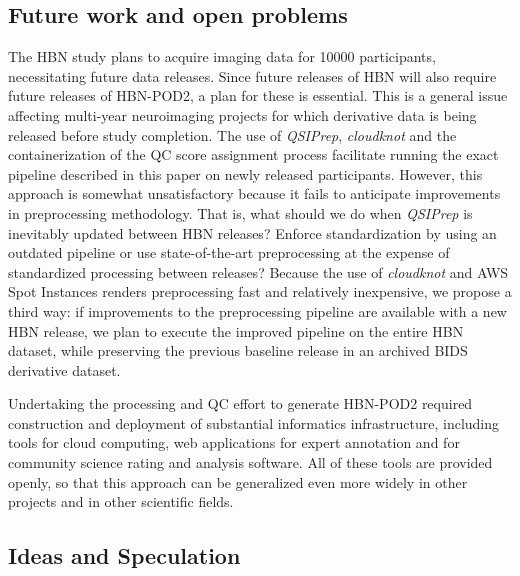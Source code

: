 \documentclass[9pt,lineno]{elife}
\begin{document}
\subsection{Future work and open problems}

The HBN study plans to acquire imaging data for \num{10000} participants,
necessitating future data releases. Since future releases of HBN will also require future releases of HBN-POD2, a plan for these is essential. This is
a general issue affecting multi-year neuroimaging projects for which derivative
data is being released before study completion. The use of \emph{QSIPrep},
\emph{cloudknot} and the containerization of the QC score assignment process
facilitate running the exact pipeline described in this paper on newly released
participants. However, this approach is somewhat unsatisfactory because it fails to
anticipate improvements in preprocessing methodology. That is, what should we do
when \emph{QSIPrep} is inevitably updated between HBN releases? Enforce
standardization by using an outdated pipeline or use state-of-the-art
preprocessing at the expense of standardized processing between releases?
Because the use of \emph{cloudknot} and AWS Spot Instances renders preprocessing
fast and relatively inexpensive, we propose a third way: if improvements to the
preprocessing pipeline are available with a new HBN release, we plan to execute
the improved pipeline on the entire HBN dataset, while preserving the previous
baseline release in an archived BIDS derivative dataset.

Undertaking the processing and QC effort to generate HBN-POD2 required
construction and deployment of substantial informatics infrastructure, including
tools for cloud computing, web applications for expert annotation and for
community science rating and analysis software. All of these tools are provided
openly, so that this approach can be generalized even more widely in other
projects and in other scientific fields.


\subsection{Ideas and Speculation}
\end{document}
